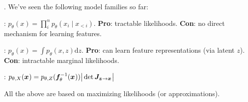 \documentclass[11pt]{article}
\renewcommand\vec[2][]{\bm{#2}_{#1}}
\newcommand\myspace[1][]{\vspace{#1\bigskipamount}\Needspace{10\baselineskip}}
\newcommand\p{\Needspace{10\baselineskip} \noindent}
\newcommand\bluesec[1]{\myspace \p \blue{#1}}
\begin{document}
\vspace{-1em}
\bluesec{Recap} . We've seen the following model families so far:
\begin{compactitem}
	\item {}: $p_{\theta}(x) = \prod_i^n p_{\theta}(x_i \mid x_{<i})$. \textbf{Pro}: tractable likelihoods. \textbf{Con}: no direct mechanism for learning features. 
	
	\item {}: $p_{\theta}(x) = \int p_{\theta}(x, z) \mathrm{d} z$. \textbf{Pro}: can learn feature representations (via latent $z$). \textbf{Con}: intractable marginal likelihoods.
	
	\item {}: $p_{\theta, X}(\vec x) = p_{\theta, Z}(\vinv[\theta]{f}(\vec x)) \big| \det \matr[\vec z \rightarrow \vec x]{J} \big|$
\end{compactitem}
All the above are based on maximizing likelihoods (or approximations).
\end{document}
